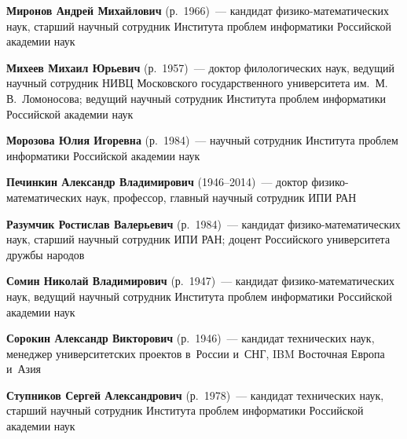 \begin{multicols}{2}
\vspace*{2pt}

\noindent
\textbf{Миронов Андрей Михайлович} (р.\ 1966)~---
кандидат фи\-зи\-ко-ма\-те\-ма\-ти\-че\-ских наук, старший научный
сотрудник Института проблем информатики Российской академии наук

\vspace*{2pt}

\noindent
\textbf{Михеев Михаил Юрьевич} (р.\ 1957)~---
доктор филологических наук, ведущий научный сотрудник НИВЦ
Московского государственного университета им.\ М.\,В.~Ломоносова;
ведущий научный сотрудник Института проблем информатики Российской академии наук

\vspace*{2pt}

\noindent
\textbf{Морозова Юлия Игоревна} (р.\ 1984)~---
научный сотрудник Института проблем информатики Российской академии наук


\pagebreak

\noindent
\textbf{Печинкин Александр Владимирович} (1946--2014)~---
доктор фи\-зи\-ко-ма\-те\-ма\-ти\-че\-ских наук, профессор,
главный научный сотрудник ИПИ РАН

\vspace*{2pt}

\noindent
\textbf{Разумчик Ростислав Валерьевич} (р.\ 1984)~---
кандидат фи\-зи\-ко-ма\-те\-ма\-ти\-че\-ских наук,
старший научный сотрудник ИПИ РАН; доцент
Российского университета дружбы народов

\vspace*{2pt}

\noindent
\textbf{Сомин Николай Владимирович} (р.\ 1947)~---
 кандидат фи\-зи\-ко-ма\-те\-ма\-ти\-че\-ских наук, ведущий научный сотрудник
 Института проблем информатики Российской академии наук

\vspace*{2pt}

 \noindent
\textbf{Сорокин Александр Викторович} (р.\ 1946)~---
кандидат технических наук, менеджер университетских проектов в~России и~СНГ,
IBM Восточная Европа и~Азия

\vspace*{2pt}

\noindent
\textbf{Ступников Сергей Александрович} (р.\ 1978)~---
кандидат технических наук, старший научный сотрудник Института
проблем информатики Российской академии наук


\def\rightkol{ОБ АВТОРАХ}
\def\leftkol{ОБ АВТОРАХ}


\end{multicols}

